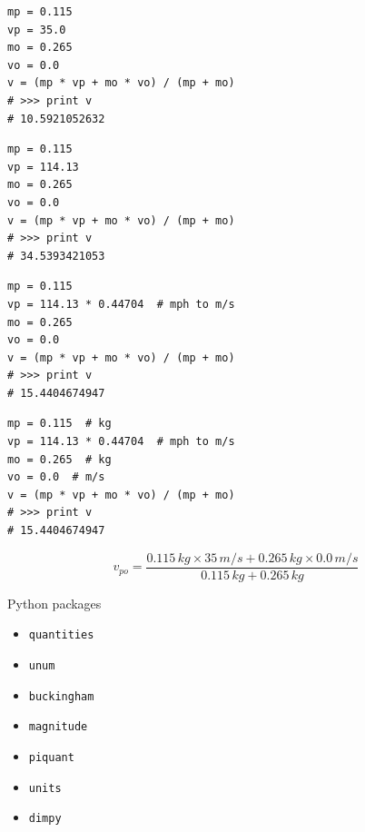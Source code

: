 \documentclass[17pt]{beamer}
\begin{document}
\begin{frame}[fragile]
  \vspace{-22pt}
  \begin{verbatim}
mp = 0.115
vp = 35.0
mo = 0.265
vo = 0.0
v = (mp * vp + mo * vo) / (mp + mo)
# >>> print v
# 10.5921052632
  \end{verbatim}
\end{frame}

\begin{frame}[fragile]
  \vspace{-22pt}
  \begin{verbatim}
mp = 0.115
vp = 114.13
mo = 0.265
vo = 0.0
v = (mp * vp + mo * vo) / (mp + mo)
# >>> print v
# 34.5393421053
  \end{verbatim}
\end{frame}

\begin{frame}[fragile]
  \vspace{-22pt}
  \begin{verbatim}
mp = 0.115
vp = 114.13 * 0.44704  # mph to m/s
mo = 0.265
vo = 0.0
v = (mp * vp + mo * vo) / (mp + mo)
# >>> print v
# 15.4404674947
  \end{verbatim}
\end{frame}

\begin{frame}[fragile]
  \vspace{-22pt}
  \begin{verbatim}
mp = 0.115  # kg
vp = 114.13 * 0.44704  # mph to m/s
mo = 0.265  # kg
vo = 0.0  # m/s
v = (mp * vp + mo * vo) / (mp + mo)
# >>> print v
# 15.4404674947
  \end{verbatim}
\end{frame}

\begin{frame}
  \vspace{-20pt}
  \begin{equation*}
    v_{po} = \frac{0.115 \,kg \times 35 \,m/s + 0.265 \,kg \times 0.0 \,m/s}
    {0.115 \,kg + 0.265 \,kg}
  \end{equation*}
\end{frame}

\begin{frame}
  \vspace{-12pt}
  Python packages
  \begin{itemize}
    \item \alert<2->{\texttt{quantities}}
    \item \texttt{unum}
    \item \texttt{buckingham}
    \item \texttt{magnitude}
    \item \texttt{piquant}
    \item \texttt{units}
    \item \texttt{dimpy}
  \end{itemize}
\end{frame}
\end{document}
